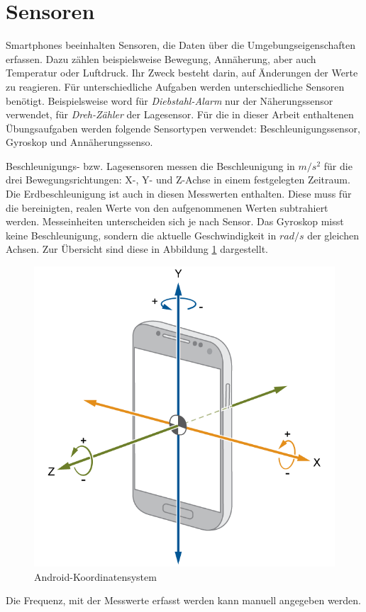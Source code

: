 \documentclass[11pt,a4paper]{report}
\begin{document}
\section{Sensoren}
Smartphones beeinhalten Sensoren, die Daten über die Umgebungseigenschaften erfassen.
Dazu zählen beispielsweise Bewegung, Annäherung, aber auch Temperatur oder Luftdruck.
Ihr Zweck besteht darin, auf Änderungen der Werte zu reagieren.
Für unterschiedliche Aufgaben werden unterschiedliche Sensoren benötigt.
Beispielsweise word für \textit{Diebstahl-Alarm} nur der Näherungssensor verwendet, für \textit{Dreh-Zähler} der Lagesensor.
Für die in dieser Arbeit enthaltenen Übungsaufgaben werden folgende Sensortypen verwendet: Beschleunigungssensor, Gyroskop und Annäherungssenso.

Beschleunigungs- bzw. Lagesensoren messen die Beschleunigung in $m/s^2$ für die drei Bewegungsrichtungen: X-, Y- und Z-Achse in einem festgelegten Zeitraum.
Die Erdbeschleunigung ist auch in diesen Messwerten enthalten.
Diese muss für die bereinigten, realen Werte von den aufgenommenen Werten subtrahiert werden\cite{accel_g}.
Messeinheiten unterscheiden sich je nach Sensor.
Das Gyroskop misst keine Beschleunigung, sondern die aktuelle Geschwindigkeit in $rad/s$ der gleichen Achsen.
Zur Übersicht sind diese in Abbildung \ref{fig:and_axes} dargestellt.
\begin{figure}[htbp]
  \centering
  \includegraphics[width=.7\textwidth]{images/android_axes.png}
  \caption{Android-Koordinatensystem}
  \label{fig:and_axes}
\end{figure}
Die Frequenz, mit der Messwerte erfasst werden kann manuell angegeben werden.
\end{document}
